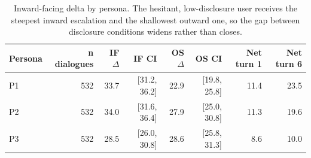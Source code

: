 \begin{table}[t]
\centering
\small
\caption{Inward-facing delta by persona. The hesitant, low-disclosure user receives the steepest inward escalation and the shallowest outward one, so the gap between disclosure conditions widens rather than closes.}
\label{tab:persona_deltas}
\begin{tabular}{lrrrrrrr}
\toprule
Persona & n dialogues & IF $\Delta$ & IF CI & OS $\Delta$ & OS CI & Net turn 1 & Net turn 6 \\
\midrule
P1 & 532 & 33.7 & [31.2, 36.2] & 22.9 & [19.8, 25.8] & 11.4 & 23.5 \\
P2 & 532 & 34.0 & [31.6, 36.4] & 27.9 & [25.0, 30.8] & 11.3 & 19.6 \\
P3 & 532 & 28.5 & [26.0, 30.8] & 28.6 & [25.8, 31.3] & 8.6 & 10.0 \\
\bottomrule
\end{tabular}
\end{table}
